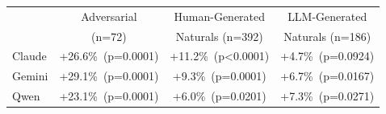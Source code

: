 \begin{tabular}{@{}lccc@{}}
\toprule
 & Adversarial & Human-Generated & LLM-Generated \\
 & (n=72) & Naturals (n=392) & Naturals (n=186) \\
\midrule
Claude & +26.6\%~(p=0.0001) & +11.2\%~(p<0.0001) & +4.7\%~(p=0.0924) \\
Gemini & +29.1\%~(p=0.0001) & +9.3\%~(p=0.0001) & +6.7\%~(p=0.0167) \\
Qwen & +23.1\%~(p=0.0001) & +6.0\%~(p=0.0201) & +7.3\%~(p=0.0271) \\
\bottomrule
\end{tabular}
